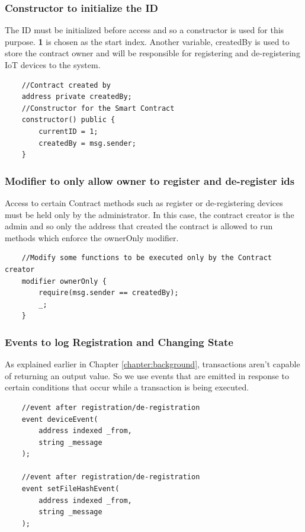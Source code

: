 \documentclass[11pt,openright]{report}
\begin{document}
\subsubsection{Constructor to initialize the ID}
The ID must be initialized before access and so a constructor is used for this purpose. \textbf{1}  is chosen as the start index. Another variable, createdBy is used to store the contract owner and will be responsible for registering and de-registering IoT devices to the system.
\begin{verbatim}
    //Contract created by
    address private createdBy;
    //Constructor for the Smart Contract
    constructor() public {
        currentID = 1;
        createdBy = msg.sender;
    }
\end{verbatim}

\subsubsection{Modifier to only allow owner to register and de-register ids}
Access to certain Contract methods such as register or de-registering devices must be held only by the administrator. In this case, the contract creator is the admin and so only the address that created the contract is allowed to run methods which enforce the ownerOnly modifier.
\begin{verbatim}
    //Modify some functions to be executed only by the Contract creator
    modifier ownerOnly {
        require(msg.sender == createdBy);
        _;
    }
\end{verbatim}

\subsubsection{Events to log Registration and Changing State}
As explained earlier in Chapter \ref{chapter:background}, transactions aren't capable of returning an output value. So we use events that are emitted in response to certain conditions that occur while a transaction is being executed.

\begin{verbatim}
    //event after registration/de-registration
    event deviceEvent(
        address indexed _from,
        string _message
    );
    
    //event after registration/de-registration
    event setFileHashEvent(
        address indexed _from,
        string _message
    );
\end{verbatim}
\end{document}
